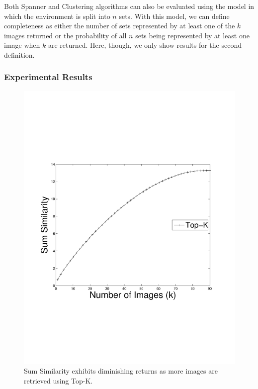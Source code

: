 Both Spanner and Clustering algorithms can also be evaluated using the model in which the environment is split into $n$ sets.  With this model, we can define completeness as either the number of sets represented by at least one of the $k$ images returned or the probability of all $n$ sets being represented by at least one image when $k$ are returned.  Here, though, we only show results for the second definition.

\subsubsection{Experimental Results}

\begin{figure} 
\centering
    \includegraphics[clip=true, trim = 20mm 65mm 25mm 70mm, scale=0.35]{figures/USC_sumsim_topk.pdf}
    \vspace{-4mm}
    \caption{Sum Similarity exhibits diminishing returns as more images are retrieved using Top-K.}
    \label{fig:topkSumSim}
    \vspace{-3mm}
\end{figure}


